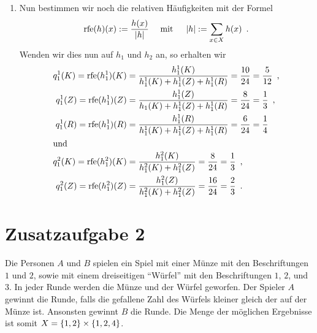\documentclass[ngerman, a4paper, 12pt]{article}
\DeclareMathOperator{\rfe}{rfe}
\newcommand{\satzende}{\enskip \text{.}}
\newcommand{\komma}{\enskip \text{,}}
\begin{document}
\begin{enumerate}[label=\textbf{(\alph*)}, leftmargin=0pt]

	\item 
	Nun bestimmen wir noch die relativen Häufigkeiten mit der Formel
	\begin{equation*}
		\rfe(h)(x) \defeq \frac{h(x)}{\abs{h}} \quad \mit \quad \abs{h} \defeq \sum_{x \in X} h(x) \satzende
	\end{equation*}
	Wenden wir dies nun auf $h_1$ und $h_2$ an, so erhalten wir
	\begin{align*}
		q_1^1(K) = \rfe(h_1^1)(K) &= \frac{h_1^1(K)}{h_1^1(K) + h_1^1(Z) + h_1^1(R)} = \frac{10}{24} = \frac{5}{12} \komma \\
		q_1^1(Z) = \rfe(h_1^1)(Z) &= \frac{h_1^1(Z)}{h_1(K) + h_1^1(Z) + h_1^1(R)} = \frac{8}{24} = \frac{1}{3} \komma \\
		q_1^1(R) = \rfe(h_1^1)(R) &= \frac{h_1^1(R)}{h_1^1(K) + h_1^1(Z) + h_1^1(R)} = \frac{6}{24} = \frac{1}{4} \\
		\intertext{und}
		q_1^2(K) = \rfe(h_1^2)(K) &= \frac{h_1^2(K)}{h_1^2(K) + h_1^2(Z)} = \frac{8}{24} = \frac{1}{3} \komma \\
		q_1^2(Z) = \rfe(h_1^2)(Z) &= \frac{h_1^2(Z)}{h_1^2(K) + h_1^2(Z)} = \frac{16}{24} = \frac{2}{3} \satzende\\
	\end{align*}
\end{enumerate}	
		
\section*{Zusatzaufgabe 2}

	Die Personen $A$ und $B$ spielen ein Spiel mit einer Münze mit den Beschriftungen $1$ und $2$, sowie mit einem dreiseitigen \enquote{Würfel} mit den Beschriftungen $1$, $2$, und $3$. In jeder Runde werden die
	Münze und der Würfel geworfen. Der Spieler $A$ gewinnt die Runde, falls die gefallene Zahl des Würfels kleiner gleich der auf der Münze ist. Ansonsten gewinnt $B$ die Runde. Die Menge der möglichen Ergebnisse ist somit $X = \left\{ 1, 2 \right\} \times \left\{ 1,2,4 \right\}$.
	 
\end{document}
